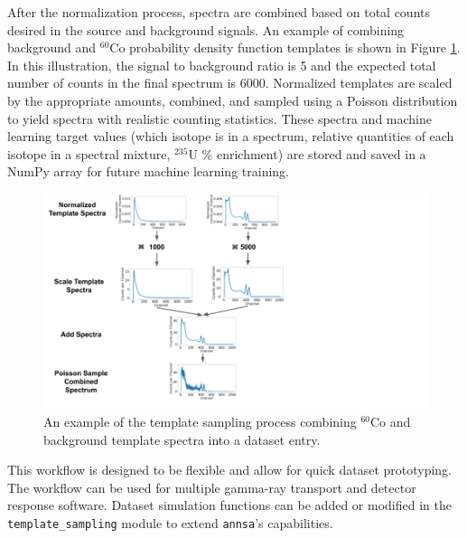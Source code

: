After the normalization process, spectra are combined based on total counts desired in the source and background signals. An example of combining background and $^{60}$Co probability density function templates is shown in Figure \ref{fig:template_sampling_diagram}. In this illustration, the signal to background ratio is 5 and the expected total number of counts in the final spectrum is 6000. Normalized templates are scaled by the appropriate amounts, combined, and sampled using a Poisson distribution to yield spectra with realistic counting statistics. These spectra and machine learning target values (which isotope is in a spectrum, relative quantities of each isotope in a spectral mixture, $^{235}$U \% enrichment) are stored and saved in a NumPy array for future machine learning training.

\begin{figure}[H]
	\centering
	\includegraphics[trim=0 0 350 0,clip,width=1.0\linewidth]{images/template_sampling_diagram.png}
	\caption{An example of the template sampling process combining $^{60}$Co and background template spectra into a dataset entry.}
	\label{fig:template_sampling_diagram}
\end{figure}

This workflow is designed to be flexible and allow for quick dataset prototyping. The workflow can be used for multiple gamma-ray transport and detector response software. Dataset simulation functions can be added or modified in the \verb|template_sampling| module to extend \verb|annsa|'s capabilities.




